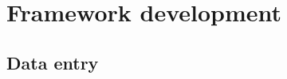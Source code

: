 \documentclass[10pt,a4paper]{article}
\begin{document}
\newpage
\section{Framework development}

%

\subsection{Data entry}
\end{document}
